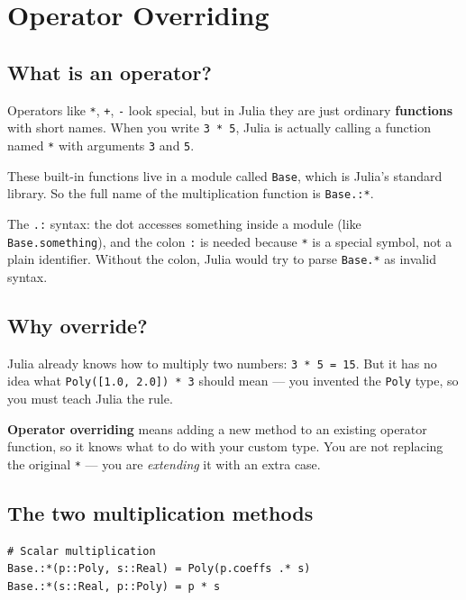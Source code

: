 \documentclass[12pt, a4paper]{article}
\newcommand{\cd}[1]{\texttt{#1}}
\begin{document}
\section{Operator Overriding}

\subsection{What is an operator?}

Operators like \cd{*}, \cd{+}, \cd{-} look special, but in Julia
they are just ordinary \textbf{functions} with short names.
When you write \cd{3 * 5}, Julia is actually calling a function
named \cd{*} with arguments \cd{3} and \cd{5}.

These built-in functions live in a module called \cd{Base},
which is Julia's standard library.
So the full name of the multiplication function is \cd{Base.:*}.

The \cd{.:} syntax: the dot accesses something inside a module
(like \cd{Base.something}), and the colon \cd{:} is needed because
\cd{*} is a special symbol, not a plain identifier.
Without the colon, Julia would try to parse \cd{Base.*} as
invalid syntax.

\subsection{Why override?}

Julia already knows how to multiply two numbers: \cd{3 * 5 = 15}.
But it has no idea what \cd{Poly([1.0, 2.0]) * 3} should mean ---
you invented the \cd{Poly} type, so you must teach Julia the rule.

\textbf{Operator overriding} means adding a new method to an
existing operator function, so it knows what to do with your custom type.
You are not replacing the original \cd{*} --- you are
\emph{extending} it with an extra case.

\subsection{The two multiplication methods}

\begin{verbatim}
# Scalar multiplication
Base.:*(p::Poly, s::Real) = Poly(p.coeffs .* s)
Base.:*(s::Real, p::Poly) = p * s
\end{verbatim}
\end{document}
